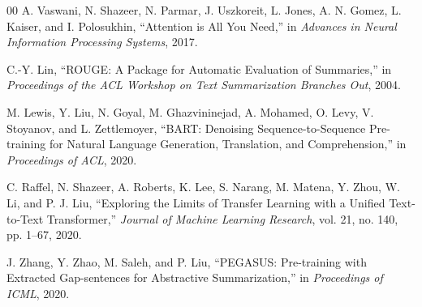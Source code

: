 \documentclass[conference]{IEEEtran}
\begin{document}
\begin{thebibliography}{00}
A. Vaswani, N. Shazeer, N. Parmar, J. Uszkoreit, L. Jones, A. N. Gomez, L. Kaiser, and I. Polosukhin, ``Attention is All You Need,'' in \textit{Advances in Neural Information Processing Systems}, 2017.

C.-Y. Lin, ``ROUGE: A Package for Automatic Evaluation of Summaries,'' in \textit{Proceedings of the ACL Workshop on Text Summarization Branches Out}, 2004.

M. Lewis, Y. Liu, N. Goyal, M. Ghazvininejad, A. Mohamed, O. Levy, V. Stoyanov, and L. Zettlemoyer, ``BART: Denoising Sequence-to-Sequence Pre-training for Natural Language Generation, Translation, and Comprehension,'' in \textit{Proceedings of ACL}, 2020.

C. Raffel, N. Shazeer, A. Roberts, K. Lee, S. Narang, M. Matena, Y. Zhou, W. Li, and P. J. Liu, ``Exploring the Limits of Transfer Learning with a Unified Text-to-Text Transformer,'' \textit{Journal of Machine Learning Research}, vol. 21, no. 140, pp. 1--67, 2020.

J. Zhang, Y. Zhao, M. Saleh, and P. Liu, ``PEGASUS: Pre-training with Extracted Gap-sentences for Abstractive Summarization,'' in \textit{Proceedings of ICML}, 2020.
\end{thebibliography}

\balance
\end{document}
